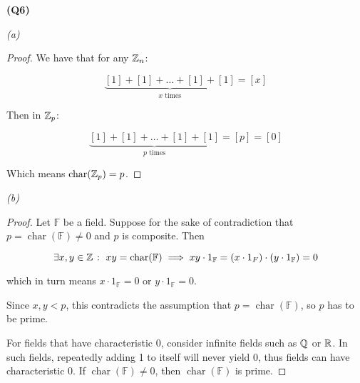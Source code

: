 \documentclass[12pt, a4paper]{article}
\newcommand{\F}{\mathbb{F}}
\newcommand{\fchar}{\operatorname{char}}
\begin{document}
\textbf{(Q6)}

\textit{(a)}

\begin{proof}
    We have that for any $\mathbb{Z}_n$:

    \[
        \underbrace{[1] + [1] + \ldots + [1] + [1]}_{x \text{ times}} = [x]
    \]

    Then in $\mathbb{Z}_p$:

    \[
        \underbrace{[1] + [1] + \ldots + [1] + [1]}_{p \text{ times}} = [p] = [0]
    \]

    Which means $\fchar (\Z_p) = p$.
\end{proof}

\textit{(b)}

\begin{proof}
    Let $\F$ be a field. Suppose for the sake of contradiction that
    $p = \fchar (\F) \neq 0$ and $p$ is composite. Then

    \[
        \exists x, y \in \Z \st xy = \fchar (\F)
        \implies xy \cdot 1_{\F} = (x \cdot 1_{F}) \cdot (y \cdot 1_{\F})
        = 0
    \]

    which in turn means $x \cdot 1_{\F} = 0$ or $y \cdot 1_{\F} = 0$.

    Since $x, y < p$, this contradicts the assumption that $p = \fchar (\F)$,
    so $p$ has to be prime.

    For fields that have characteristic 0, consider infinite fields such as $\mathbb{Q}$
    or $\mathbb{R}$. In such fields, repeatedly adding 1 to itself will never yield
    0, thus fields can have characteristic 0. If $\fchar (\F) \neq 0$, then
    $\fchar (\F)$ is prime.
\end{proof}
\end{document}
